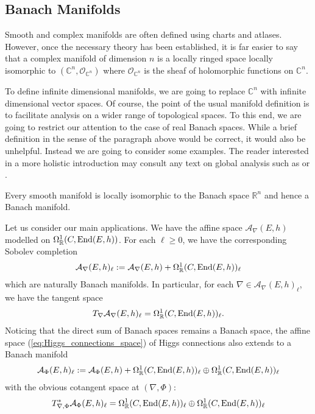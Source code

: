 \documentclass[12pt]{ociamthesis}  %
\begin{document}
\subsection{Banach Manifolds}

Smooth and complex manifolds are often defined using charts and
atlases. However, once the necessary theory has been established,
it is far easier to say that a complex manifold
of dimension $n$ is a locally ringed space locally isomorphic to
$(\mathbb{C}^n,\mathcal O_{\mathbb{C}^n})$ where
$\mathcal O_{\mathbb{C}^n}$ is the sheaf of holomorphic functions on
$\mathbb{C}^n$.

To define infinite dimensional manifolds, we are going to replace
$\mathbb{C}^n$ with infinite dimensional vector spaces. Of course,
the point of the usual manifold definition is to facilitate analysis
on a wider range of topological spaces. To this end, we are going to
restrict our attention to the case of real Banach spaces. While a brief
definition in the sense of the paragraph above would be correct,
it would also be unhelpful. Instead we are going to consider some
examples. The reader interested in a more holistic
introduction may consult any text on global analysis such
as \cite[Chapter 7]{kahn1982} or \cite{bc2009}.

\begin{example}
  Every smooth manifold is locally isomorphic to
  the Banach space $\mathbb R^n$ and hence a Banach manifold.
\end{example}

\begin{example}
  Let us consider our main applications. We have the affine space
  $\mathcal A_\nabla(E,h)$ modelled on $\Omega^1_{\mathbb{R}}(C,\operatorname{End}(E,h))$.
  For each $\ell \geq 0$, we have the corresponding Sobolev completion
  \begin{align*}
    \mathcal A_\nabla(E,h)_\ell := \mathcal A_\nabla(E,h) + \Omega^1_{\mathbb{R}}(C,\operatorname{End}(E,h))_\ell
  \end{align*}
  which are naturally Banach manifolds.
  In particular, for each $\nabla\in \mathcal A_\nabla(E,h)_\ell$, we have the
  tangent space
  \begin{align*}
    T_\nabla \mathcal A_\nabla(E,h)_\ell
    = \Omega^1_{\mathbb{R}}(C,\operatorname{End}(E,h))_\ell.
  \end{align*}
  Noticing that the direct sum of Banach spaces remains a Banach space,
  the affine space (\ref{eq:Higgs_connections_space}) of Higgs connections also
  extends to a Banach manifold
  \begin{align*}
    \mathcal A_\Phi(E,h)_\ell := \mathcal A_\Phi(E,h) + \Omega^1_{\mathbb{R}}(C,\operatorname{End}(E,h))_\ell
    \oplus \Omega^1_{\mathbb{R}}(C,\operatorname{End}(E,h))_\ell
  \end{align*}
  with the obvious cotangent space at $(\nabla,\Phi)$:
  \begin{align*}
    T^*_{\nabla,\Phi} \mathcal A_\Phi(E,h)_\ell
    = \Omega^1_{\mathbb{R}}(C,\operatorname{End}(E,h))_\ell
    \oplus \Omega^1_{\mathbb{R}}(C,\operatorname{End}(E,h))_\ell
  \end{align*}
\end{example}
\end{document}
